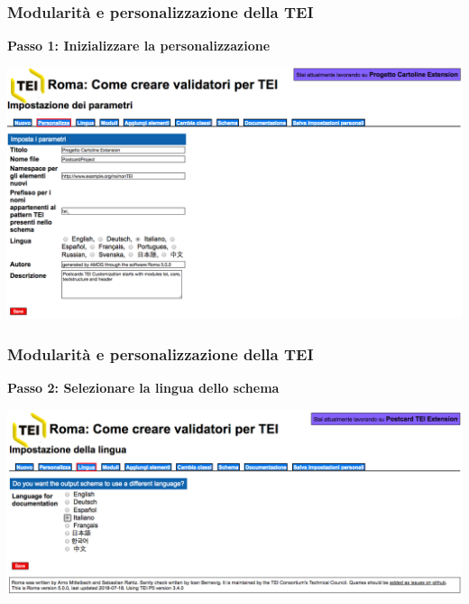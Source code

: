     \begin{frame}
        \frametitle{Modularità e personalizzazione della TEI}
        \addtocounter{nframe}{1}
        
        \textbf{Passo 1: Inizializzare la personalizzazione}

         \begin{center}
            \includegraphics[width=.95\textwidth]{imgs/Roma2.png}
         \end{center}
       
        
    \end{frame}



\begin{frame}
    \frametitle{Modularità e personalizzazione della TEI}
    \addtocounter{nframe}{1}
    
    \textbf{Passo 2: Selezionare la lingua dello schema}

     \begin{center}
        \includegraphics[width=.95\textwidth]{imgs/Roma3.png}
     \end{center}
   
    
\end{frame}

